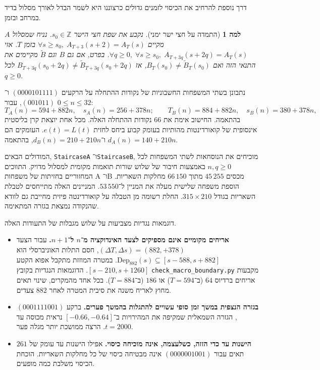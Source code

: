 \documentclass[11pt,a4paper]{article}
\DeclareRobustCommand{\textenglish}[1]{\foreignlanguage{english}{#1}}
\newtheorem{lemma}[theorem]{למה}
\theoremstyle{definition}
\begin{document}
דרך נוספת להרחיב את הכיסוי לזמנים גדולים כרצוננו היא לשמר הבדל לאורך מסלול בדיד במרחב ובזמן.

\begin{lemma}[התמדה על חצי ישר ימני]\label{lem:ballistic_ray}
נקבע את שפת חצי הישר $s_0\in\mathbb Z$. נניח שמסלול $A$ מקיים $\forall s \ge s_0,\; A_{T+3}(s + 2) = A_T(s)$ בזמן $T$. אזי $\forall q \ge 0,\; \forall s \ge s_0,\; A_{T+3q}(s + 2q) = A_T(s)$. בפרט, אם גם $B$ וגם $\widetilde B$ מקיימים את התנאי הזה ואם $B_T(s_0) \ne \widetilde B_T(s_0)$, אז $B_{T+3q}(s_0 + 2q) \ne \widetilde B_{T+3q}(s_0 + 2q)$ לכל $q \ge 0$.
\end{lemma}

נתבונן בשתי המשפחות החשבוניות של נקודות ההתחלה על הרקעים $(0000101111)$ ו־$(001011)$, עבור $0 \le n \le 32$:
\begin{equation}
T_A(n) = 594 + 882n,\quad s_A(n) = 256 + 378n; \qquad
T_B(n) = 884 + 882n,\quad s_B(n) = 380 + 378n,
\end{equation}
בהתאמה. החישוב אימת את $66$ נקודות ההתחלה האלה. מכל אחת יוצאת קרן בליסטית אינסופית של קואורדינטות מהותיות בעומק קבוע ביחס לחזית $e(t) = L(t)$. העומקים הם $d_A(n) = 140 + 210n$ ו־$d_B(n) = 210 + 210n$, בהתאמה.

המודולים הבאים, \textenglish{\texttt{StaircaseA}} ו־\textenglish{\texttt{StaircaseB}}, מוכיחים את הנוסחאות לשתי המשפחות לכל $n,q\ge0$ באמצעות חיבור של שלוש שורות תואמות מקומית למסלול מדויק. התווכים המחזוריים בחזיתות של משפחות \textenglish{A} ו־\textenglish{B} מכסים $45\,255$ מתוך $66\,150$ מחלקות השאריות. הוספת משפחה שלישית מעלה את המניין ל־$53\,550$. המניינים האלה מתייחסים לטבלת השאריות בגודל $315\times210$. החלת רשומה מן הטבלה על קואורדינטה פיזית מחייבת גם לוודא שהנקודה נמצאת בגזרה המתאימה.

דוגמאות נגדיות מצביעות על שלוש מגבלות של התעודות האלה.
\begin{itemize}
    \item \textbf{אריחים מקומיים אינם מספיקים לצעד האינדוקציה מ־$n$ ל־$n+1$.} עבור הצעד $(\Delta T, \Delta s) = (882, +378)$, חסם התלות האוניברסלי הוא $\mathrm{Dep}_{882}(s) \subseteq [s - 588, s + 882]$. במטרה המוזזת מתקבל אפוא הקטע $[s - 210, s + 1260]$. הדוגמאות הנגדיות בקובץ \textenglish{\texttt{check\_macro\_boundary.py}} מקבעות אריחים ברדיוס $64$ (ב־$T=594$) או $186$ (ב־$T=884$). בכל אחד מהמקרים, שינוי תאים מחוץ לאריח משנה את סיבית המטרה לאחר $882$ צעדים.
    \item \textbf{בגזרה הנצפית במשך זמן סופי עשויים להתגלות בהמשך פערים.} ברקע $(0001111001)$, הגזרה השמאלית שמקיפה את המהירויות ב־$[-0.66, -0.64]$ נראית מכוסה עד $t = 2000$. הרצה ממושכת יותר מגלה פער.
    \item \textbf{הישנות עד כדי הזזה, כשלעצמה, אינה מוכיחה כיסוי.} אפילו הישנות עד עומק של $261$ תאים עבור $(0000001001)$ אינה מבטיחה כיסוי של כל מחלקות השאריות. הוכחת הכיסוי משלבת כמה מופעים.
\end{itemize}
\end{document}
